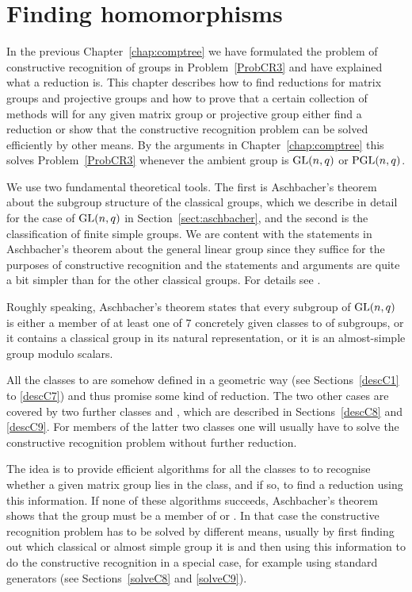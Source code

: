 
\chapter{Finding homomorphisms}
\label{chap:findhom}

In the previous Chapter~\ref{chap:comptree} we have formulated the problem
of constructive recognition of groups in Problem~\ref{ProbCR3} and have
explained what a reduction is. This chapter describes how to find
reductions for matrix groups and projective groups and how to prove
that a certain collection of methods will for any given
matrix group or projective group either find a reduction
or show that the constructive 
recognition problem can be solved efficiently by other means. By the 
arguments in Chapter~\ref{chap:comptree} this solves
Problem~\ref{ProbCR3} whenever the ambient group is $\GL(n,q)$ or
$\PGL(n,q)$.

We use two fundamental theoretical tools. The first is Aschbacher's theorem
about the subgroup structure of the classical groups, which we describe
in detail for the case of $\GL(n,q)$ in Section~\ref{sect:aschbacher},
and the second is the classification of finite simple groups. We are
content with the statements in Aschbacher's theorem about the general
linear group since they suffice for the purposes of constructive
recognition and the statements and arguments are quite a bit simpler
than for the other classical groups. For details see \cite{aschbacher}.

Roughly speaking, Aschbacher's theorem states that every subgroup of $\GL(n,q)$
is either a member of at least one of $7$ concretely given classes 
 to  of 
subgroups, or it contains a classical group in its natural representation, 
or it is an almost-simple group modulo scalars.

All the classes  to  are somehow defined in a geometric way (see
Sections~\ref{descC1} to \ref{descC7}) and thus promise some kind of
reduction. The two other cases are covered by two further classes 
and , which are described in Sections~\ref{descC8} and \ref{descC9}.
For members of the latter two classes one will usually have to solve the
constructive recognition problem without further reduction.

The idea is to provide efficient algorithms for all the classes  to
 to recognise whether a given matrix group lies in the class, and if
so, to find a reduction using this information. If none of these algorithms
succeeds, Aschbacher's theorem shows that the group must be a member of
 or . In that case the constructive recognition problem has to be
solved by different means, usually by first finding out which classical
or almost simple group it is and then using this information to do the
constructive recognition in a special case, for example using standard
generators (see Sections~\ref{solveC8} and \ref{solveC9}).

